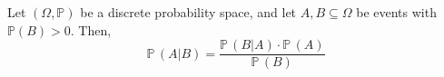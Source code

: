 \documentclass[aspectratio=169]{beamer}
\begin{document}
\begin{wallpaperframe}
Let $(\Omega, \mathbb{P})$ be a discrete probability space, and let $A, B \subseteq \Omega$ be events with $\mathbb{P}(B) > 0$. Then,
\[
\mathbb{P}\,(A|B) = \frac{\mathbb{P}\,(B|A) \cdot \mathbb{P}\,(A)}{\mathbb{P}\,(B)}
\]
\end{wallpaperframe}
\end{document}
